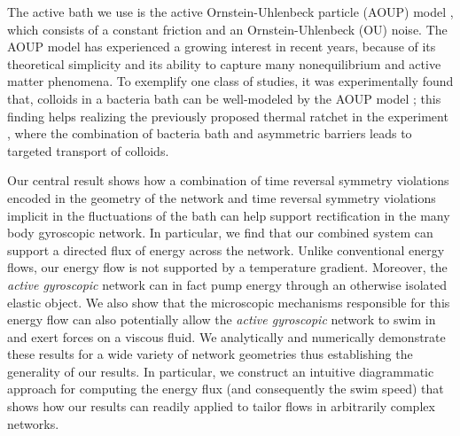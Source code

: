 \documentclass[
 preprint,
 preprintnumbers,
 amsmath,amssymb,
 aps,
 pre,
 longbibliography,
 10pt, twocolumn
]{revtex4-1}
\begin{document}


The active bath we use is the active Ornstein-Uhlenbeck particle (AOUP) model \cite{Fodor2016HowMatter}, which consists of a constant friction and an Ornstein-Uhlenbeck (OU) noise. The AOUP model has experienced a growing interest in recent years, because of its theoretical simplicity and its ability to capture many nonequilibrium and active matter phenomena.
To exemplify one class of studies, it was experimentally found that, colloids in a bacteria bath can be well-modeled by the AOUP model \cite{Wu2000ParticleBath}; this finding helps realizing the previously proposed thermal ratchet \cite{Magnasco1993ForcedRatchets} in the experiment \cite{Koumakis2013TargetedBacteria}, where the combination of bacteria bath and asymmetric barriers leads to targeted transport of colloids.

Our central result shows how a combination of time reversal symmetry violations encoded in the geometry of the network and time reversal symmetry violations implicit in the fluctuations of the bath can help support rectification in the many body gyroscopic network. In particular, we find that our combined system can support a directed flux of energy across the network. Unlike conventional energy flows, our energy flow is not supported by a temperature gradient. Moreover, the \textit{active gyroscopic} network can in fact pump energy through an otherwise isolated elastic object. We also show that the microscopic mechanisms responsible for this energy flow can also potentially allow the \textit{active gyroscopic} network to swim in and exert forces on a viscous fluid. We analytically and numerically demonstrate these results for a wide variety of network geometries thus establishing the generality of our results. In particular, we construct an intuitive diagrammatic approach for computing the energy flux (and consequently the swim speed) that shows how our results can readily applied to tailor flows in arbitrarily complex networks. 
\end{document}
